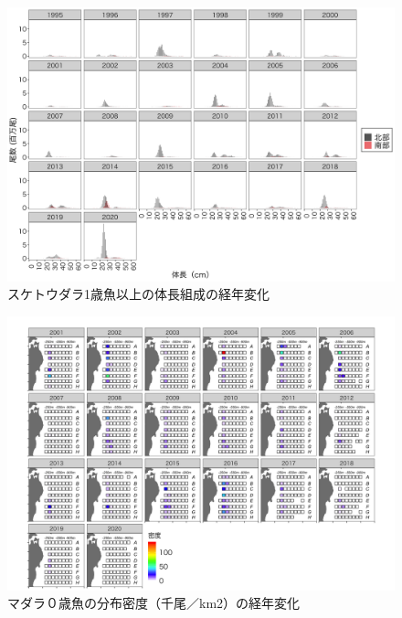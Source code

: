 \documentclass[11pt]{article} %
\begin{document}
\begin{linenumbers}
\begin{figure}[h]
  \centering
  \includegraphics[width = 14cm]{スケトウダラ1+length.png}
  \caption{スケトウダラ1歳魚以上の体長組成の経年変化}
\end{figure}

\begin{figure}[h]
  \centering
  \includegraphics[width = 14cm]{マダラ０＋dens.png}
  \caption{マダラ０歳魚の分布密度（千尾／km2）の経年変化}
\end{figure}


\end{linenumbers}
\end{document}
